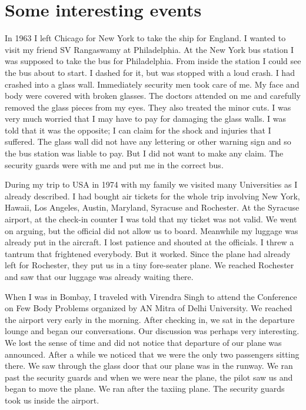 \section*{Some interesting events}

In 1963 I left Chicago for New York to take the ship for England. I 
wanted to visit my friend SV Rangaswamy at Philadelphia. At the New York 
bus station I was supposed to take the bus for Philadelphia. From inside 
the station I could see the bus about to start. I dashed for it, but was 
stopped with a loud crash. I had crashed into a glass wall. Immediately 
security men took care of me. My face and body were covered with broken 
glasses. The doctors attended on me and carefully removed the glass 
pieces from my eyes. They also treated the minor cuts. I was very much 
worried that I may have to pay for damaging the glass walls. I was told 
that it was the opposite; I can claim for the shock and injuries that I 
suffered. The glass wall did not have any lettering or other warning 
sign and so the bus station was liable to pay. But I did not want to 
make any claim. The security guards were with me and put me in the 
correct bus.

During my trip to USA in 1974 with my family we visited many 
Universities as I already described. I had bought air ticke\-ts for the 
whole trip involving New York, Hawaii, Los Angeles, Austin, Maryland, 
Syracuse and Rochester. At the Syracuse airport, at the check-in counter 
I was told that my ticket was not valid. We went on arguing, but the 
official did not allow us to board. Meanwhile my luggage was already put 
in the aircraft. I lost patience and shouted at the officials. I threw a 
tantrum that frightened everybody. But it worked. Since the plane had 
already left for Rochester, they put us in a tiny fore-seater plane. We 
reached Rochester and saw that our luggage was already wai\-ting there.


When I was in Bombay, I traveled with Virendra Singh to attend the 
Conference on Few Body Problems organized by AN Mitra of Delhi 
University. We reached the airport very early in the morning. After 
checking in, we sat in the departure lounge and began our conversations. 
Our discussion was perhaps very interesting. We lost the sense of time 
and did not notice that departure of our plane was announced. After a 
while we noticed\- that we were the only two passengers sitting there. We 
saw through the glass door that our plane was in the runway. We ran past 
the security guards and when we were near the plane, the pilot saw us 
and began to move the plane. We ran after the taxiing plane. The 
security guards took us inside the airport.


